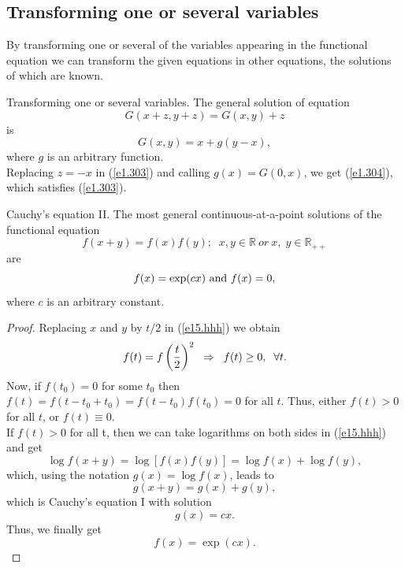 \documentclass[
	11pt, %
	fleqn, %
	a4paper, %
]{LegrandOrangeBook}
\newcommand{\R}{\mathbb{R}}
\begin{document}
\subsection{Transforming one or several variables}\label{s2.3} By transforming one or several of the variables
appearing in the functional equation we can transform the given
equations in other equations, the solutions of which are known.

\begin{example}{Transforming one or several variables. }
The general solution of equation
\begin{equation}\label{e1.303}
G(x+z,y+z)=G(x,y)+z
\end{equation}
is
\begin{equation}\label{e1.304}
G(x,y)=x+g(y-x),
\end{equation}
where $g$ is an arbitrary function.\\

 Replacing $z=-x$ in (\ref{e1.303}) and
calling $g(x)=G(0,x)$, we get (\ref{e1.304}), which satisfies
(\ref{e1.303}).
\end{example}

\begin{theorem}{Cauchy's equation II. }\label{th2.6}
The most general continuous-at-a-point solutions of the functional
equation
\begin{equation}\label{e15.hhh}
f(x+y)=f(x)f(y);\;\;x,y\in \R \ or\ x,\;y\in \R_{++}
\end {equation}
are
\begin{equation}\label{e3.16}
f(x)=\exp (cx)\  {\rm and}\  f(x)=0,
\end {equation}
where $c$ is an arbitrary constant.
\end{theorem}
\begin{proof}
Replacing $x$ and $y$ by $t/2$ in (\ref{e15.hhh}) we obtain
\begin{displaymath}
f(t)=f\left({t \over 2}\right)^2\;\;\Rightarrow \;\;f(t)\ge 0,\;\;\forall t.
\end{displaymath}
Now, if $f (t_0)=0$ for some $t_0$ then $f(t)=f (t -t_0+t_0)=f (t-t_0) f(t_0)=0$ for
all $t$. Thus, either $f(t)>0$ for all $t$, or $f(t)\equiv 0$.
\\
If $f(t)>0$ for all t, then we can take logarithms on both sides in
(\ref{e15.hhh}) and get
\begin{displaymath}
\log {f(x+y)}=\log \left[ f(x)f(y)\right] =\log {f(x)}+\log
{f(y)},
\end{displaymath}
which, using the notation $g(x)=\log f(x)$, leads to
\begin{displaymath}
g(x+y)=g(x)+g(y),
\end{displaymath}
which is Cauchy's equation I with solution
\begin{displaymath}
g(x)=cx.
\end{displaymath}
Thus, we finally get
\begin{displaymath}
f(x)=\exp(cx).
\end{displaymath}
\end{proof}
\end{document}
